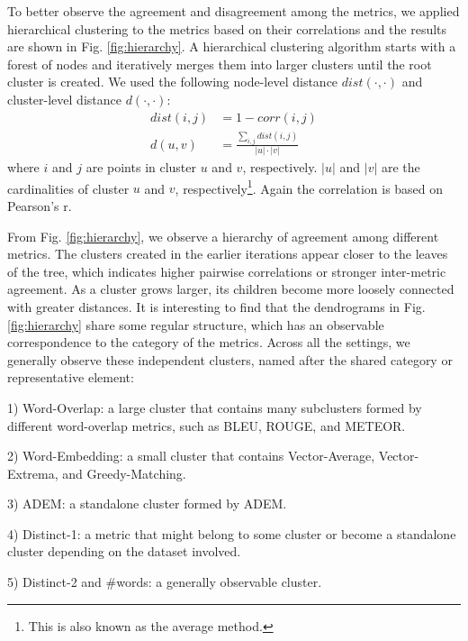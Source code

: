 \documentclass[conference]{IEEEtran}
\begin{document}
    To better observe the agreement and disagreement among the metrics, we applied hierarchical clustering to the metrics based on their correlations and the results are shown in Fig. \ref{fig:hierarchy}. A hierarchical clustering algorithm starts with a forest of nodes and iteratively merges them into larger clusters until the root cluster is created. We used the following node-level distance $\textit{dist}(\cdot, \cdot)$ and cluster-level distance $d(\cdot, \cdot)$:
    \begin{align}
        \textit{dist}(i, j) &= 1 - \textit{corr}(i, j) \\
        d(u, v) &= \frac{\sum_{i,j}\textit{dist}(i, j)}{|u| \cdot |v|}
    \end{align}
    where $i$ and $j$ are points in cluster $u$ and $v$, respectively. $|u|$ and $|v|$ are the cardinalities of cluster $u$ and $v$, respectively\footnote{This is also known as the average method.}. Again the correlation is based on Pearson's r.
    

    From Fig. \ref{fig:hierarchy}, we observe a hierarchy of agreement among different metrics. The clusters created in the earlier iterations appear closer to the leaves of the tree, which indicates higher pairwise correlations or stronger inter-metric agreement. As a cluster grows larger, its children become more loosely connected with greater distances. It is interesting to find that the dendrograms in Fig. \ref{fig:hierarchy} share some regular structure, which has an observable correspondence to the category of the metrics. Across all the settings, we generally observe these independent clusters, named after the shared category or representative element:

    1) Word-Overlap: a large cluster that contains many subclusters formed by different word-overlap metrics, such as BLEU, ROUGE, and METEOR.

    2) Word-Embedding: a small cluster that contains Vector-Average, Vector-Extrema, and Greedy-Matching.

    3) ADEM: a standalone cluster formed by ADEM.

    4) Distinct-1: a metric that might belong to some cluster or become a standalone cluster depending on the dataset involved.

    5) Distinct-2 and \#words: a generally observable cluster.
\end{document}
